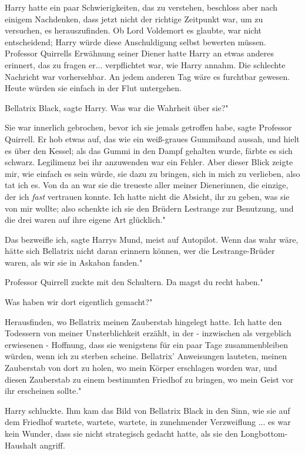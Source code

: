 Harry hatte ein paar Schwierigkeiten, das zu verstehen, beschloss aber nach
einigem Nachdenken, dass jetzt nicht der richtige Zeitpunkt war, um zu
versuchen, es herauszufinden. Ob Lord Voldemort es glaubte, war nicht
entscheidend; Harry würde diese Anschuldigung selbst bewerten müssen. Professor
Quirrells Erwähnung seiner Diener hatte Harry an etwas anderes erinnert, das zu
fragen er... verpflichtet war, wie Harry annahm. Die schlechte Nachricht war
vorhersehbar. An jedem anderen Tag wäre es furchtbar gewesen. Heute würden sie
einfach in der Flut untergehen.

\glqq{}Bellatrix Black\grqq{}, sagte Harry. \glqq{}Was war die Wahrheit über sie?"

\glqq{}Sie war innerlich gebrochen, bevor ich sie jemals getroffen habe\grqq{},
sagte Professor Quirrell. Er hob etwas auf, das wie ein weiß-graues Gummiband
aussah, und hielt es über den Kessel; als das Gummi in den Dampf gehalten wurde,
färbte es sich schwarz. \glqq{}Legilimenz bei ihr anzuwenden war ein Fehler. Aber
dieser Blick zeigte mir, wie einfach es sein würde, sie dazu zu bringen, sich in
mich zu verlieben, also tat ich es. Von da an war sie die treueste aller meiner
Dienerinnen, die einzige, der ich \emph{fast} vertrauen konnte. Ich hatte nicht
die Absicht, ihr zu geben, was sie von mir wollte; also schenkte ich sie den
Brüdern Lestrange zur Benutzung, und die drei waren auf ihre eigene Art
glücklich."

\glqq{}Das bezweifle ich\grqq{}, sagte Harrys Mund, meist auf Autopilot. \glqq
Wenn das wahr wäre, hätte sich Bellatrix nicht daran erinnern können, wer die
Lestrange-Brüder waren, als wir sie in Askaban fanden."

Professor Quirrell zuckte mit den Schultern. \glqq{}Da magst du recht haben."

\glqq{}Was haben wir dort eigentlich gemacht?"

\glqq{}Herausfinden, wo Bellatrix meinen Zauberstab hingelegt hatte. Ich hatte
den Todessern von meiner Unsterblichkeit erzählt, in der - inzwischen als
vergeblich erwiesenen - Hoffnung, dass sie wenigstens für ein paar Tage
zusammenbleiben würden, wenn ich zu sterben scheine. Bellatrix' Anweisungen
lauteten, meinen Zauberstab von dort zu holen, wo mein Körper erschlagen worden
war, und diesen Zauberstab zu einem bestimmten Friedhof zu bringen, wo mein
Geist vor ihr erscheinen sollte."

Harry schluckte. Ihm kam das Bild von Bellatrix Black in den Sinn, wie sie auf
dem Friedhof wartete, wartete, wartete, in zunehmender Verzweiflung ... es war
kein Wunder, dass sie nicht strategisch gedacht hatte, als sie den
Longbottom-Haushalt angriff.

